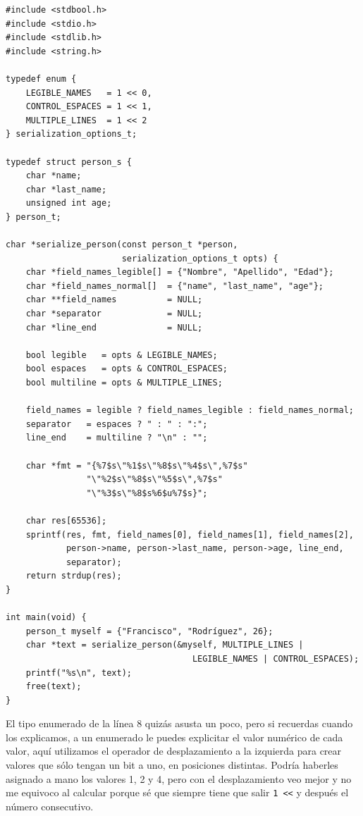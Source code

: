 \documentclass[a4paper]{article}
\begin{document}
\noindent
\begin{minipage}[H]{\linewidth}
\mbox{}
\begin{lstlisting}[style=C, label={lst:options},
caption={Implementación de opciones con operaciones a nivel de bit}]
#include <stdbool.h>
#include <stdio.h>
#include <stdlib.h>
#include <string.h>

typedef enum {
    LEGIBLE_NAMES   = 1 << 0,
    CONTROL_ESPACES = 1 << 1,
    MULTIPLE_LINES  = 1 << 2
} serialization_options_t;

typedef struct person_s {
    char *name;
    char *last_name;
    unsigned int age;
} person_t;

char *serialize_person(const person_t *person,
                       serialization_options_t opts) {
    char *field_names_legible[] = {"Nombre", "Apellido", "Edad"};
    char *field_names_normal[]  = {"name", "last_name", "age"};
    char **field_names          = NULL;
    char *separator             = NULL;
    char *line_end              = NULL;

    bool legible   = opts & LEGIBLE_NAMES;
    bool espaces   = opts & CONTROL_ESPACES;
    bool multiline = opts & MULTIPLE_LINES;

    field_names = legible ? field_names_legible : field_names_normal;
    separator   = espaces ? " : " : ":";
    line_end    = multiline ? "\n" : "";

    char *fmt = "{%7$s\"%1$s\"%8$s\"%4$s\",%7$s"
                "\"%2$s\"%8$s\"%5$s\",%7$s"
                "\"%3$s\"%8$s%6$u%7$s}";

    char res[65536];
    sprintf(res, fmt, field_names[0], field_names[1], field_names[2],
            person->name, person->last_name, person->age, line_end,
            separator);
    return strdup(res);
}

int main(void) {
    person_t myself = {"Francisco", "Rodríguez", 26};
    char *text = serialize_person(&myself, MULTIPLE_LINES |
                                     LEGIBLE_NAMES | CONTROL_ESPACES);
    printf("%s\n", text);
    free(text);
}
\end{lstlisting}
\end{minipage}

El tipo enumerado de la línea 8 quizás asusta un poco, pero si recuerdas cuando
los explicamos, a un enumerado le puedes explicitar el valor numérico de cada
valor, aquí utilizamos el operador de desplazamiento a la izquierda para
crear valores que sólo tengan un bit a uno, en posiciones distintas. Podría
haberles asignado a mano los valores 1, 2 y 4, pero con el desplazamiento veo
mejor y no me equivoco al calcular porque sé que siempre tiene que salir
\verb!1 <<! y después el número consecutivo.
\end{document}
